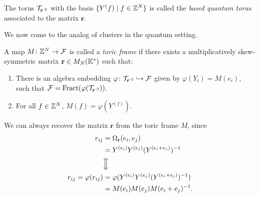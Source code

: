 \documentclass{article}
\DeclareMathOperator{\Fract}{Fract}
\begin{document}
The torus $\mathcal{T}_{\mathbf{r}^{\cdot 2}}$ with the basis $\{Y^(f) \mid f \in \mathbb{Z}^N\}$
is called the \emph{based quantum torus} associated to the matrix $\mathbf{r}$.

We now come to the analog of clusters in the quantum setting.
\begin{definition}
    A map $M \colon \mathbb{Z}^N \to \mathcal{F}$ is called a \emph{toric frame} if there exists
    a multiplicatively skew-symmetric matrix $\mathbf{r} \in M_N(\mathbb{K}^*)$ such that:
    \begin{enumerate}
        \item There is an algebra embedding
              $\varphi \colon \mathcal{T}_{\mathbf{r}^{\cdot 2}} \hookrightarrow \mathcal{F}$
              given by $\varphi(Y_i) = M(e_i)$, such that
              $\mcF = \Fract(\varphi(\mcT_{\mathbf{r}^{\cdot 2}}))$.
        \item For all $f \in \mathbb{Z}^N$, $M(f) = \varphi(Y^{(f)})$.
    \end{enumerate}
\end{definition}
\begin{remark}
    We can always recover the matrix $\mathbf{r}$ from the toric frame $M$,
    since
    \begin{align*}
        r_{ij}
                                 & = \Omega_{\mathbf{r}}(e_i, e_j)                    \\
                                 & = Y^{(e_i)}Y^{(e_j)}(Y^{(e_i + e_j)})^{-1}          \\
                                 & \Big\Updownarrow                                   \\
        r_{ij} = \varphi(r_{ij}) & = \varphi(Y^{(e_i)}Y^{(e_j)}(Y^{(e_i + e_j)})^{-1}) \\
                                 & = M(e_i)M(e_j)M(e_i + e_j)^{-1}.
    \end{align*}

\end{remark}





\end{document}
